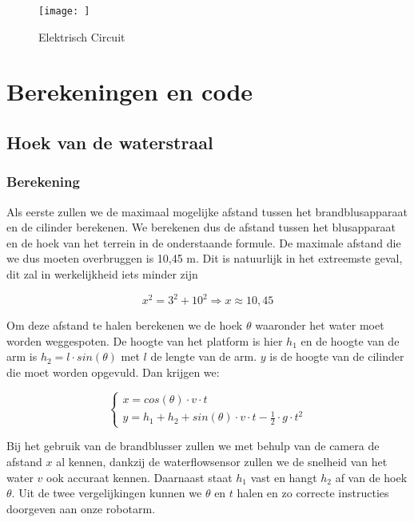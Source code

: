 \documentclass[kulak]{kulakarticle} %
\begin{document}
			\begin{figure} [!h]
			\centering
			\texttt{[image: ]}
			\caption{Elektrisch Circuit}
			\label{elektriek}
		\end{figure}
		


\section{Berekeningen en code}


	\subsection{Hoek van de waterstraal}
	
	
		\subsubsection{Berekening}
		
			Als eerste zullen we de maximaal mogelijke afstand tussen het brandblusapparaat en de cilinder berekenen. We berekenen dus de afstand tussen het blusapparaat en de hoek van het terrein in de onderstaande formule. De maximale afstand die we dus moeten overbruggen is 10,45 m. Dit is natuurlijk in het extreemste geval, dit zal in werkelijkheid iets minder zijn
		
				\begin{equation}
					x^2 = 3^2 + 10^2
					\Rightarrow x \approx 10,45 
				\end{equation}
				
			Om deze afstand te halen berekenen we de hoek $\theta$ waaronder het water moet worden weggespoten. De hoogte van het platform is hier \(h_1\) en de hoogte van de arm is \(h_2 = l \cdot sin(\theta)\) met \(l\) de lengte van de arm. \(y\) is de hoogte van de cilinder die moet worden opgevuld. Dan krijgen we:
			
				\begin{equation}
					\begin{cases}
						x  = cos(\theta) \cdot v \cdot t \\
						y = h_1 + h_2 + sin(\theta) \cdot v \cdot t - \frac{1}{2} \cdot g \cdot t^2
					\end{cases}
				\end{equation}
				
			Bij het gebruik van de brandblusser zullen we met behulp van de camera de afstand \(x\) al kennen, dankzij de waterflowsensor zullen we de snelheid van het water \(v\) ook accuraat kennen.  Daarnaast staat \(h_1\) vast en hangt \(h_2\) af van de hoek \(\theta\). Uit de twee vergelijkingen kunnen we \(\theta\) en \(t\) halen en zo correcte instructies doorgeven aan onze robotarm.
\end{document}
